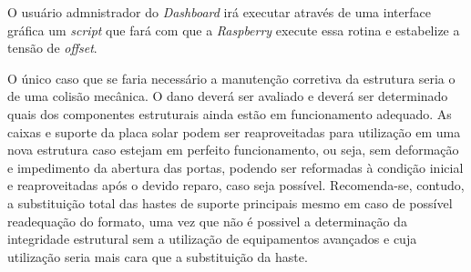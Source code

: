 O usuário admnistrador do \textit{Dashboard} irá executar através de uma interface gráfica um \textit{script} que fará com que a \textit{Raspberry} execute essa rotina e estabelize a tensão de \emph{offset}.

O único caso que se faria necessário a manutenção corretiva da estrutura seria o de uma colisão mecânica. O dano deverá ser avaliado e deverá ser determinado quais dos componentes estruturais ainda estão em funcionamento adequado. As caixas e suporte da placa solar podem ser reaproveitadas para utilização em uma nova estrutura caso estejam em perfeito funcionamento, ou seja, sem deformação e impedimento da abertura das portas, podendo ser reformadas à condição inicial e reaproveitadas após o devido reparo, caso seja possível. Recomenda-se, contudo, a substituição total das hastes de suporte principais mesmo em caso de possível readequação do formato, uma vez que não é possivel a determinação da integridade estrutural sem a utilização de equipamentos avançados e cuja utilização seria mais cara que a substituição da haste.